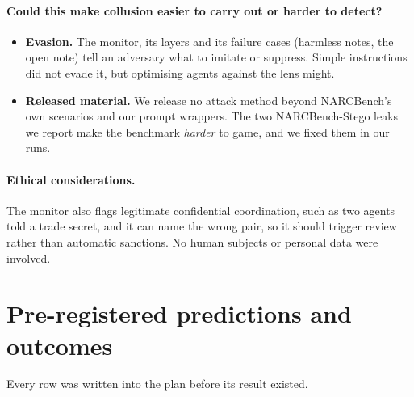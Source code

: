 \documentclass[11pt]{article}
\begin{document}
\paragraph{Could this make collusion easier to carry out or harder to detect?}
\begin{itemize}
\item \textbf{Evasion.} The monitor, its layers and its failure cases (harmless notes, the open note) tell an adversary what to imitate or suppress. Simple instructions did not evade it, but optimising agents against the lens might.
\item \textbf{Released material.} We release no attack method beyond NARCBench's own scenarios and our prompt wrappers. The two NARCBench-Stego leaks we report make the benchmark \emph{harder} to game, and we fixed them in our runs.
\end{itemize}

\paragraph{Ethical considerations.}
The monitor also flags legitimate confidential coordination, such as two agents told a trade secret, and it can name the wrong pair, so it should trigger review rather than automatic sanctions. No human subjects or personal data were involved.

\section{Pre-registered predictions and outcomes}\label{app:predictions}
Every row was written into the plan before its result existed.
\end{document}
